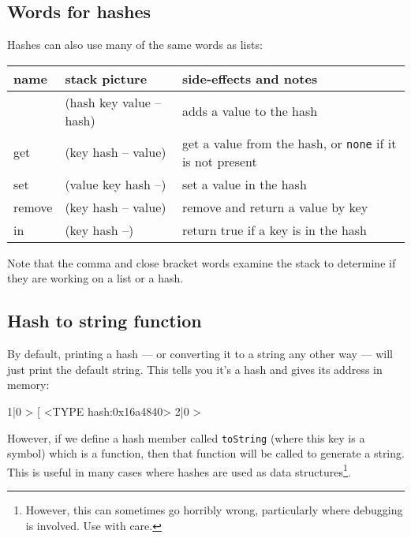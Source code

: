 \subsection{Words for hashes}
Hashes can also use many of the same words as lists:
\indw{[\%}\indw{,}
\begin{center}
\begin{tabular}{|l|l|p{4in}|}\hline
\textbf{name} & \textbf{stack picture} & \textbf{side-effects and notes}\\ \hline
[\%    & (-- hash)    & creates a new hash\\
,    & (hash key value -- hash) & adds a value to the hash\\
]    & (hash key value -- hash) & adds a value to the hash\\
get & (key hash -- value) & get a value from the hash, or \texttt{none} if it is not present\\
set & (value key hash --) & set a value in the hash\\
remove & (key hash -- value) & remove and return a value by key\\
in & (key hash --) & return true if a key is in the hash\\
\hline
\end{tabular}
\end{center}
Note that the comma and close bracket words examine the stack to
determine if they are working on a list or a hash.

\subsection{Hash to string function}
By default, printing a hash --- or converting it to a string any other way ---
will just print the default string. This tells you it's a hash and gives
its address in memory:
\begin{v}
1|0 > [%
<TYPE hash:0x16a4840>
2|0 > 
\end{v}
However, if we define a hash member called \verb+toString+ (where this
key is a symbol) which is a function, then that function will be called
to generate a string. This is useful in many cases where hashes are used
as data structures\footnote{However, this can sometimes go horribly
wrong, particularly where debugging is involved. Use with care.}.

